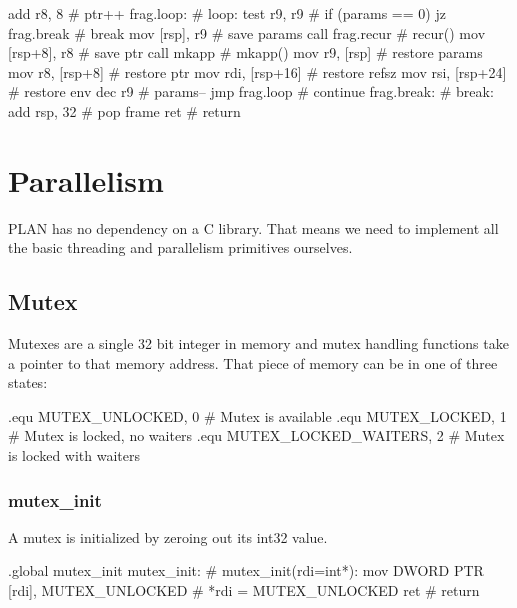 \begin{asm}
	add	r8, 8                       #   ptr++
frag.loop:                                  # loop:
	test	r9, r9                      #   if (params == 0)
	jz	frag.break                  #     break
	mov	[rsp], r9                   #   save params
	call	frag.recur                  #   recur()
	mov	[rsp+8], r8                 #   save ptr
	call	mkapp                       #   mkapp()
	mov	r9, [rsp]                   #   restore params
	mov	r8, [rsp+8]                 #   restore ptr
	mov	rdi, [rsp+16]               #   restore refsz
	mov	rsi, [rsp+24]               #   restore env
	dec	r9                          #   params--
	jmp	frag.loop                   #   continue
frag.break:                                 # break:
	add	rsp, 32                     #   pop frame
	ret                                 #   return
\end{asm}

\section{Parallelism}

PLAN has no dependency on a C library. That means we need to implement all the
basic threading and parallelism primitives ourselves.

\subsection{Mutex}

Mutexes are a single 32 bit integer in memory and mutex handling functions take
a pointer to that memory address. That piece of memory can be in one of three
states:

\begin{asm}
.equ	MUTEX_UNLOCKED, 0		    # Mutex is available
.equ	MUTEX_LOCKED, 1			    # Mutex is locked, no waiters
.equ	MUTEX_LOCKED_WAITERS, 2		    # Mutex is locked with waiters
\end{asm}

\subsubsection{mutex\_init}

A mutex is initialized by zeroing out its int32 value.

\begin{asm}
.global mutex_init
mutex_init:				    # mutex_init(rdi=int*):
    mov DWORD PTR [rdi], MUTEX_UNLOCKED	    #   *rdi = MUTEX_UNLOCKED
    ret					    #   return
\end{asm}

